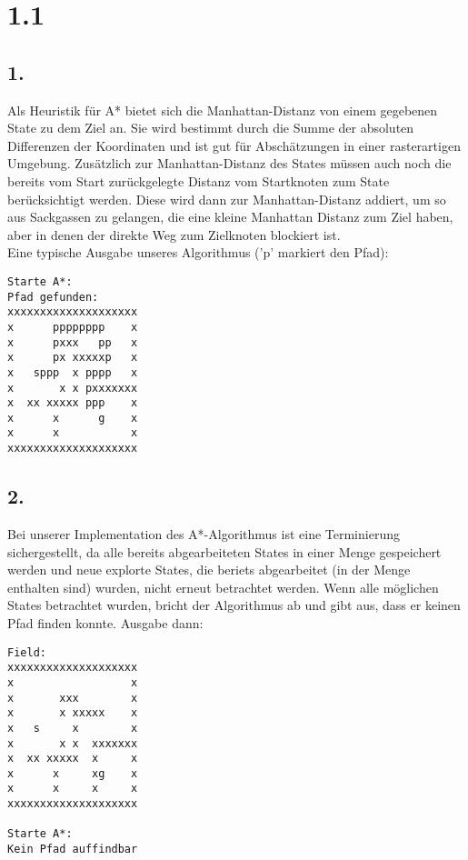 \documentclass[a4paper,11pt,fleqn]{scrartcl}
\title{\titleinfo}
\author{\authorinfo}
\begin{document}
\maketitle

\section*{1.1}
\subsection*{1.}
Als Heuristik für A* bietet sich die Manhattan-Distanz von einem gegebenen State zu dem Ziel an. Sie wird bestimmt durch die Summe der absoluten Differenzen der Koordinaten und ist gut für Abschätzungen in einer rasterartigen Umgebung.
Zusätzlich zur Manhattan-Distanz des States müssen auch noch die bereits vom Start zurückgelegte Distanz vom Startknoten zum State berücksichtigt werden.
Diese wird dann zur Manhattan-Distanz addiert, um so aus Sackgassen zu gelangen, die eine kleine Manhattan Distanz zum Ziel haben, aber in denen der direkte Weg zum Zielknoten blockiert ist.\\
Eine typische Ausgabe unseres Algorithmus ('p' markiert den Pfad):\\
\begin{verbatim}
Starte A*:
Pfad gefunden:
xxxxxxxxxxxxxxxxxxxx
x      pppppppp    x
x      pxxx   pp   x
x      px xxxxxp   x
x   sppp  x pppp   x
x       x x pxxxxxxx
x  xx xxxxx ppp    x
x      x      g    x
x      x           x
xxxxxxxxxxxxxxxxxxxx
\end{verbatim}

\subsection*{2.}
Bei unserer Implementation des A*-Algorithmus ist eine Terminierung sichergestellt, da alle bereits abgearbeiteten States in einer Menge gespeichert werden und neue explorte States, die beriets 
abgearbeitet (in der Menge enthalten sind) wurden, nicht erneut betrachtet werden. Wenn alle möglichen States betrachtet wurden, bricht der Algorithmus ab und gibt aus, dass er keinen Pfad finden konnte.
\newpage
Ausgabe dann:

\begin{verbatim}
Field:
xxxxxxxxxxxxxxxxxxxx
x                  x
x       xxx        x
x       x xxxxx    x
x   s     x        x
x       x x  xxxxxxx
x  xx xxxxx  x     x
x      x     xg    x
x      x     x     x
xxxxxxxxxxxxxxxxxxxx

Starte A*:
Kein Pfad auffindbar
\end{verbatim}
\end{document}

